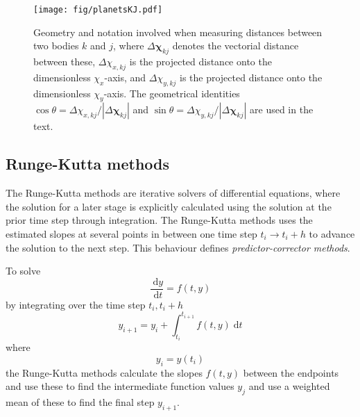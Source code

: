 \documentclass[a4paper,11pt]{article}
\newcommand{\diff}{\ensuremath{\; \text{d}}}
\begin{document}
\begin{figure}[htb]
    \centering
    \texttt{[image: fig/planetsKJ.pdf]}
    \caption{Geometry and notation involved when measuring distances between two bodies $k$ and $j$, where $\Delta \boldsymbol{\chi}_{kj}$ denotes the vectorial distance between these, $\Delta \chi_{x,kj}$ is the projected distance onto the dimensionless $\chi_x$-axis, and $\Delta \chi_{y,kj}$ is the projected distance onto the dimensionless $\chi_y$-axis. The geometrical identities $\cos \theta = \Delta \chi_{x,kj}/|\Delta \boldsymbol{\chi}_{kj}|$ and $\sin \theta = \Delta \chi_{y,kj}/|\Delta \boldsymbol{\chi}_{kj}|$ are used in the text. } 
    \label{fig:geometry}
\end{figure}


\subsection{Runge-Kutta methods}
The Runge-Kutta methods are iterative solvers of differential equations, where the solution for a later stage is explicitly calculated using the solution at the prior time step through integration. The Runge-Kutta methods uses the estimated slopes at several points in between one time step $t_i \to t_i + h$ to advance the solution to the next step. This behaviour defines \textit{predictor-corrector methods}. 

To solve
\[ \frac{\diff y}{\diff t} = f(t,y) \]
by integrating over the time step $t_i,t_i+h$
\[ y_{i+1} = y_i + \int_{t_i}^{t_{i+1}} f(t,y) \diff t \]
where
\[ y_i = y(t_i) \]
the Runge-Kutta methods calculate the slopes $f(t,y)$ between the endpoints and use these to find the intermediate function values $y_j$ and use a weighted mean of these to find the final step $y_{i+1}$.
\end{document}
